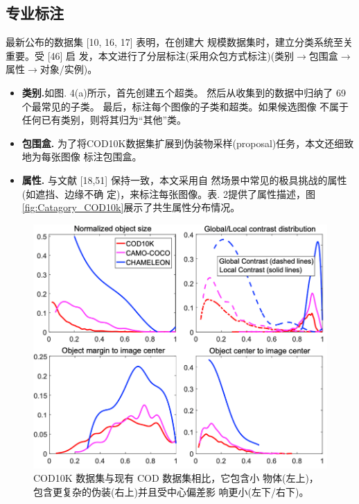 \documentclass[final]{cvpr}
\renewcommand{\figref}[1]{图\ref{#1}}
\begin{document}
\subsection{专业标注}
最新公布的数据集 [10, 16, 17] 表明，在创建大 规模数据集时，建立分类系统至关重要。受 [46] 启 发，本文进行了分层标注(采用众包方式标注)(类别$\longrightarrow$包围盒$\longrightarrow$属性$\longrightarrow$对象/实例)。
\begin{itemize}
    \item  \textbf{类别.}如图. 4(a)所示，首先创建五个超类。 然后从收集到的数据中归纳了 69 个最常见的子类。 最后，标注每个图像的子类和超类。如果候选图像 不属于任何已有类别，则将其归为“其他”类。
    \item \textbf{包围盒.} 为了将COD10K数据集扩展到伪装物采样(proposal)任务，本文还细致地为每张图像 标注包围盒。
    \item \textbf{属性. }与文献 [18,51] 保持一致，本文采用自 然场景中常见的极具挑战的属性 (如遮挡、边缘不确 定)，来标注每张图像。表. 2提供了属性描述，\figref{fig:Catagory_COD10k}展示了共生属性分布情况。
\end{itemize}
\begin{figure}[tp]
    \centering
    \includegraphics[width=0.98\columnwidth]{COD_Zh_translate/figures/Graph_analyse_COD10k.png}\small
    \caption{ COD10K 数据集与现有 COD 数据集相比，它包含小 物体(左上)，包含更复杂的伪装(右上)并且受中心偏差影 响更小(左下/右下)。
}
    \label{fig:Graph_analyse_COD10k}
\end{figure}
\end{document}
